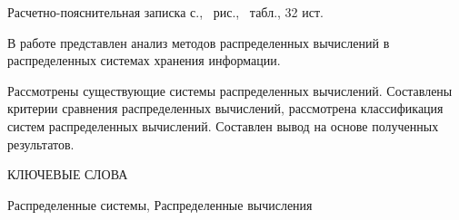 Расчетно-пояснительная записка \pageref{LastPage} с., \totalfigures\ рис., \totaltables\ табл., 32 ист.

В работе представлен анализ методов распределенных вычислений в распределенных системах хранения информации.

Рассмотрены существующие системы распределенных вычислений. 
Составлены критерии сравнения распределенных вычислений, 
рассмотрена классификация систем распределенных вычислений.
Составлен вывод на основе полученных результатов.

КЛЮЧЕВЫЕ СЛОВА

Распределенные системы, Распределенные вычисления
